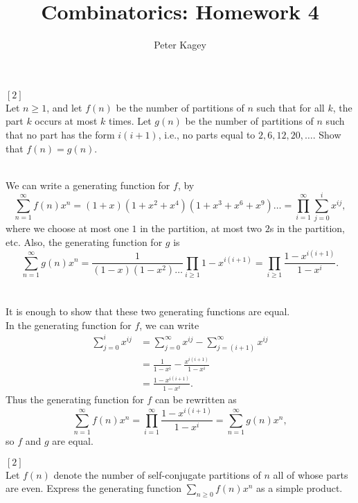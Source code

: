 \documentclass{article}
\newenvironment{problem}[2][Problem]{\begin{trivlist}
\item[\hskip \labelsep {\bfseries #1}\hskip \labelsep {\bfseries #2.}]}{\end{trivlist}}
\newenvironment{solution}[1][Solution.]{\begin{trivlist}
\item[\hskip \labelsep {\bfseries #1}]}{\end{trivlist}}
\begin{document}
\title{Combinatorics: Homework 4}
\author{Peter Kagey}

\maketitle

\begin{problem}{68} $[2]$ \\
  Let $n \geq 1$, and let $f(n)$ be the number of partitions of $n$ such that
  for all $k$, the part $k$ occurs at most $k$ times. Let $g(n)$ be the number
  of partitions of $n$ such that no part has the form $i(i+1)$, i.e., no parts
  equal to $2, 6, 12, 20, \hdots$. Show that $f(n) = g(n)$.
\end{problem}

\begin{solution} \text{} \\
  We can write a generating function for $f$, by \[
    \sum_{n = 1}^\infty f(n)x^n
      = (1 + x)(1 + x^2 + x^4)(1 + x^3 + x^6 + x^9)\hdots
      = \prod_{i=1}^\infty\sum_{j=0}^i x^{ij},
  \] where we choose at most one $1$ in the partition, at most two $2$s in the
  partition, etc.
  Also, the generating function for $g$ is \[
    \sum_{n = 1}^\infty g(n)x^n
    = \frac{1}{{(1 - x)(1-x^2)\hdots}}\prod_{i \geq 1}1 - x^{i(i+1)}
    = \prod_{i \geq 1}\frac{1 - x^{i(i+1)}}{1 - x^i}.
  \]
  \\~\\
  It is enough to show that these two generating functions are equal.
  \\
  In the generating function for $f$, we can write \begin{align*}
    \sum_{j=0}^i x^{ij}
    &= \sum_{j=0}^\infty x^{ij} - \sum_{j=(i+1)}^\infty x^{ij} \\
    &= \frac{1}{1 - x^i} - \frac{x^{i(i + 1)}}{1 - x^i} \\
    &= \frac{1 - x^{i(i+1)}}{1 - x^i}.
  \end{align*}
  Thus the generating function for $f$ can be rewritten as \[
    \sum_{n = 1}^\infty f(n)x^n
    = \prod_{i = 1}^\infty \frac{1 - x^{i(i+1)}}{1 - x^i}
    = \sum_{n = 1}^\infty g(n)x^n,
  \] so $f$ and $g$ are equal.
\end{solution}
\pagebreak
\begin{problem}{69} $[2]$ \\
  Let $f(n)$ denote the number of self-conjugate partitions of $n$ all of whose
  parts are even. Express the generating function $\sum_{n \geq 0}f(n)x^n$ as a
  simple product.
\end{problem}
\end{document}
